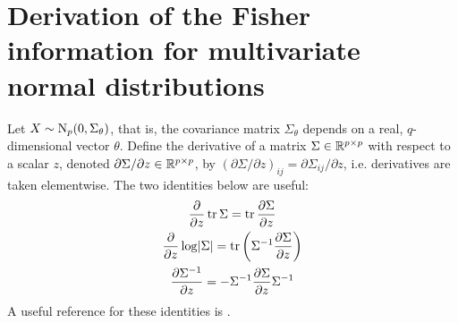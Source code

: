\section{Derivation of the Fisher information for multivariate normal distributions}
\label{apx:fishermultinormal}

Let $X\sim\operatorname{N}_p(0,\Sigma_\theta)$, that is, the covariance matrix $\Sigma_\theta$ depends on a real, $q$-dimensional vector $\theta$.
Define the derivative of a matrix $\Sigma \in \mathbb{R}^{p\times p}$ with respect to a scalar $z$, denoted $\partial\Sigma/\partial z \in \mathbb{R}^{p\times p}$, by $(\partial\Sigma/\partial z)_{ij} = \partial \Sigma_{ij}/\partial z$, i.e. derivatives are taken elementwise.
The two identities below are useful:
\begin{gather}
  \frac{\partial}{\partial z} \operatorname{tr}\Sigma = \operatorname{tr} \frac{\partial\Sigma}{\partial z} \\
  \frac{\partial}{\partial z} \log \lvert\Sigma\rvert = \operatorname{tr}\left( \Sigma^{-1} \frac{\partial\Sigma}{\partial z} \right) \\
  \frac{\partial\Sigma^{-1}}{\partial z} = -\Sigma^{-1} \frac{\partial\Sigma}{\partial z}\Sigma^{-1}
\end{gather}
A useful reference for these identities is \citet{petersen2008matrix}.

\newcommand{\dSi}{\frac{\partial\Sigma_\theta}{\partial \theta_i}}
\newcommand{\dSinv}{\frac{\partial\Sigma_\theta^{-1}}{\partial \theta_i}}
\newcommand{\dSj}{\frac{\partial\Sigma_\theta}{\partial \theta_j}}
\newcommand{\dSjnv}{\frac{\partial\Sigma_\theta^{-1}}{\partial \theta_j}}
\newcommand{\dStwo}{\frac{\partial^2\Sigma_\theta}{\partial \theta_i\theta_j}}

